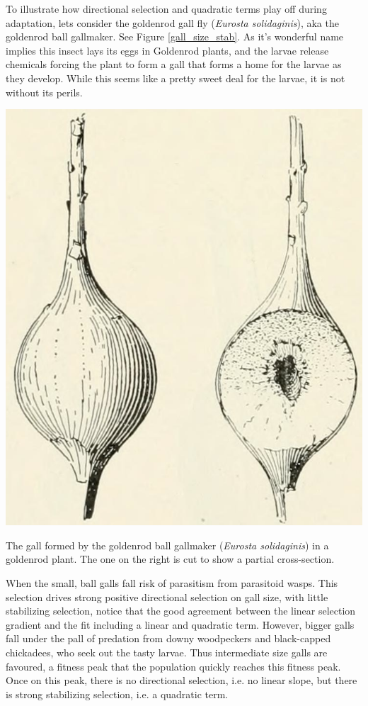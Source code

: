 To illustrate how directional selection and quadratic terms play off
during adaptation, lets consider the goldenrod gall fly ({\it Eurosta solidaginis}), aka the goldenrod
ball gallmaker. See Figure \ref{gall_size_stab}. As it's wonderful name
implies this insect lays its eggs in Goldenrod plants, and the larvae
release chemicals forcing the plant to form a gall that forms a home
for the larvae as they develop. While this seems like a pretty sweet
deal for the larvae, it is not without its perils. \begin{marginfigure}[2cm]
\begin{center}
\includegraphics[width= 0.7 \textwidth]{illustration_images/Quant_gen/goldenrod_ball_gall_maker/goldenrod_ball_gall_maker.png}
\end{center}
\caption{The gall formed by the goldenrod
ball gallmaker ({\it Eurosta solidaginis}) in a goldenrod plant. The
one on the right is cut to show a partial cross-section.  }  
\end{marginfigure}
When the small, ball galls fall risk of parasitism from parasitoid
wasps. This selection drives strong positive directional selection on
gall size, with little stabilizing selection, notice that the good
agreement between the linear selection gradient and the fit including
a linear and quadratic term. However, bigger galls fall under the pall of predation from downy
woodpeckers and black-capped chickadees, who seek out the tasty
larvae. Thus intermediate size galls are favoured, a fitness peak that
the population quickly reaches this fitness peak. Once on this peak,
there is no directional selection, i.e. no linear slope, but there
is strong stabilizing selection, i.e. a quadratic term. 

